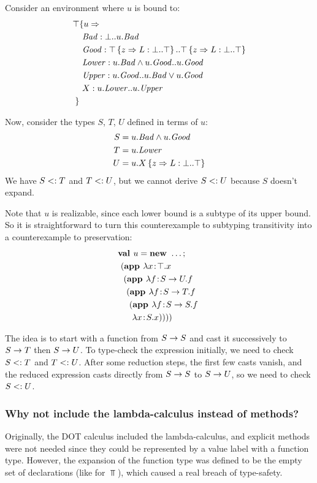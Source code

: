 \documentclass[9pt]{sigplanconf}
\begin{document}
Consider an environment where $u$ is bound to:
\begin{align*}
\top & \{u \Rightarrow \\
&\ \mathit{Bad} : \bot..u.\mathit{Bad}\\
&\ \mathit{Good} : \top \left\{z \Rightarrow L : \bot..\top \right\}..\top \left\{z \Rightarrow L : \bot..\top \right\}\\
&\ \mathit{Lower} : u.\mathit{Bad} \wedge u.\mathit{Good}..u.\mathit{Good}\\
&\ \mathit{Upper} : u.\mathit{Good}..u.\mathit{Bad} \vee u.\mathit{Good}\\
&\ X : u.\mathit{Lower}..u.\mathit{Upper}\\
 \}&
\end{align*}

Now, consider the types $S$, $T$, $U$ defined in terms of $u$:
\begin{align*}
S &= u.\mathit{Bad} \wedge u.\mathit{Good}\\
T &= u.\mathit{Lower}\\
U &= u.X \left\{z \Rightarrow L : \bot..\top \right\}
\end{align*}
We have $S <: T$ and $T <: U$, but we cannot derive $S <: U$ because
$S$ doesn't expand.

Note that $u$ is realizable, since each lower bound is a subtype of
its upper bound. So it is straightforward to turn this counterexample
to subtyping transitivity into a counterexample to preservation:
\begin{align*}
&\mlnew u \ldots {
\ \mlapp{\abs x \Top x}{
\ \ \mlapp{\abs f {S \tfun U} f}{
\ \ \ \mlapp{\abs f {S \tfun T} f}{
\ \ \ \ \mlapp{\abs f {S \tfun S} f}{
\ \ \  \ \ \abs x S x}}}}}
\end{align*}

The idea is to start with a function from $S \rightarrow S$ and cast it
successively to $S \rightarrow T$ then $S \rightarrow U$. To type-check the
expression initially, we need to check $S <: T$ and $T <:
U$. After some reduction steps, the first few casts vanish, and the
reduced expression casts directly from $S \rightarrow S$ to $S \rightarrow U$, so
we need to check $S <: U$.

\subsubsection{Why not include the lambda-calculus instead of methods?}

Originally, the DOT calculus included the lambda-calculus, and
explicit methods were not needed since they could be represented by a
value label with a function type. However, the expansion of the
function type was defined to be the empty set of declarations (like
for $\Top$), which caused a real breach of type-safety.
\end{document}
